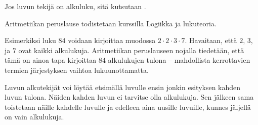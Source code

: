 \begin{esimerkki}
\end{esimerkki}

Jos luvun tekijä on alkuluku, sitä kutsutaan .

% 	


Aritmetiikan peruslause todistetaan kurssilla Logiikka ja lukuteoria. %

Esimerkiksi luku $84$ voidaan kirjoittaa muodossa $2\cdot 2\cdot 3\cdot 7$. Havaitaan, että $2$, $3$, ja $7$ ovat kaikki alkulukuja. Aritmetiikan peruslauseen nojalla tiedetään, että tämä on ainoa tapa kirjoittaa $84$ alkulukujen tulona -- mahdollista kerrottavien termien järjestyksen vaihtoa lukuunottamatta.

Luvun alkutekijät voi löytää etsimällä luvulle ensin jonkin esityksen kahden luvun tulona. Näiden kahden luvun ei tarvitse olla alkulukuja. Sen jälkeen sama toistetaan näille kahdelle luvulle ja edelleen aina uusille luvuille, kunnes jäljellä on vain alkulukuja.

% 	


